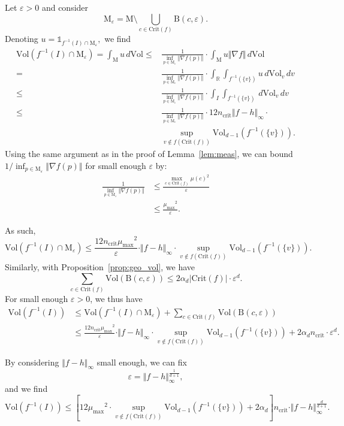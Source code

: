 \documentclass[pdflatex,sn-mathphys-ay]{sn-jnl}%
\newcommand{\man}{\mathrm{M}}
\newcommand{\critic}{{\mathrm {Crit}}}
\newcommand{\ball}{{\mathrm {B}}}
\newcommand{\vol}{\mathrm{Vol}}
\newcommand{\ind}{\mathds{1}}
\newcommand{\R}{\mathbb{R}}
\newcommand{\eps}{\varepsilon}
\newcommand{\preim}[2]{#1^{-1}(#2)}
\newcommand{\mub}{{\mu_{\text{max}}}}
\newcommand{\crib}{{n_{\text{crit}}}}
\newcommand{\inorm}[1]{\Vert #1\Vert_\infty}
\newcommand{\ff}{h}
\theoremstyle{thmstyleone}%
\begin{document}
\begin{appendices}
Let $\eps>0$ and consider $$\man_\eps=\man\setminus \bigcup_{c \in \critic(f)}\ball\left(c,\eps\right).$$
Denoting $u=\ind_{\preim{f}{I}\cap\man_\eps},$ we find
\begin{align*}
\vol\left(\preim{f}{I}\cap\man_\eps\right)=\int_\man u\,d\vol\leq&\frac{1}{\inf_{p\in\man_\eps}\Vert\nabla f(p)\Vert}\cdot \int_\man u\Vert\nabla f\Vert\,d\vol\\
=&\frac{1}{\inf_{p\in\man_\eps}\Vert\nabla f(p)\Vert}\cdot\int_{\R}\int_{\preim{f}{\{v\}}}u\,d\vol_v\,dv\\
\leq&\frac{1}{\inf_{p\in\man_\eps}\Vert\nabla f(p)\Vert}\cdot\int_{I}\int_{\preim{f}{\{v\}}}\,d\vol_v\,dv\\
\leq& \frac{1}{\inf_{p\in\man_\eps}\Vert\nabla f(p)\Vert}\cdot12\crib\inorm{f-\ff}\cdot\\
&\sup_{v\notin f(\critic(f))}\vol_{d-1}\left(\preim{f}{\{v\}}\right).
\end{align*}
Using the same argument as in the proof of Lemma~\ref{lem:meas}, we can bound $1/\inf_{p\in\man_\eps}\Vert\nabla f(p)\Vert$ for small enough $\eps$ by:
\begin{align*}
\frac{1}{\inf_{p\in\man_\eps}\Vert\nabla f(p)\Vert} &\leq \frac{\max_{c\in\critic(f)}\mu(c)^2}{\eps}\\
&\leq \frac{\mub^2}{\eps}.
\end{align*}

As such,
$$\vol\left(\preim{f}{I}\cap\man_\eps\right)\leq\frac{12\crib\mub^2}{\eps}\cdot\inorm{f-\ff}\cdot\sup_{v\notin f(\critic(f))}\vol_{d-1}\left(\preim{f}{\{v\}}\right).$$
Similarly, with Proposition~\ref{prop:geo_vol}, we have
$$\sum_{c\in\critic(f)}\vol\left(\ball\left(c,\eps\right)\right)\leq 2\alpha_d\left|\critic(f)\right|\cdot\eps^d.$$
For small enough $\eps>0$, we thus have
\begin{align*}
\vol\left(\preim{f}{I}\right)&\leq\vol\left(\preim{f}{I}\cap\man_\eps\right)+\sum_{c\in\critic(f)}\vol\left(\ball\left(c,\eps\right)\right)\\
&\leq\frac{12\crib\mub^2}{\eps}\cdot\inorm{f-\ff}\cdot\sup_{v\notin f(\critic(f))}\vol_{d-1}\left(\preim{f}{\{v\}}\right)+2\alpha_d\crib\cdot\eps^d.
\end{align*}

By considering $\inorm{f-\ff}$ small enough, we can fix $$\eps=\inorm{f-\ff}^{\frac{1}{d+1}},$$
and we find
$$\vol\left(\preim{f}{I}\right)\leq\left[12\mub^2\cdot\sup_{v\notin f(\critic(f))}\vol_{d-1}\left(\preim{f}{\{v\}}\right)+2\alpha_d\right]\crib\cdot\inorm{f-\ff}^{\frac{d}{d+1}}.$$


\end{appendices}
\end{document}
